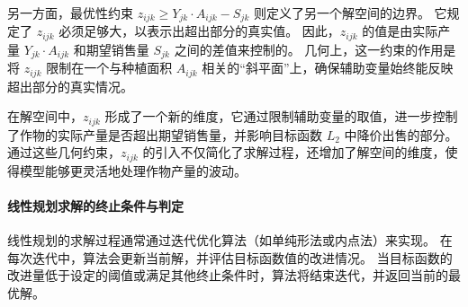 \documentclass[12pt,a4paper]{nmmcm}
\begin{document}
另一方面，最优性约束 $z_{ijk} \geq Y_{jk} \cdot A_{ijk} - S_{jk}$ 则定义了另一个解空间的边界。
它规定了 $z_{ijk}$ 必须足够大，以表示出超出部分的真实值。
因此，$z_{ijk}$ 的值是由实际产量 $Y_{jk} \cdot A_{ijk}$ 和期望销售量 $S_{jk}$ 之间的差值来控制的。
几何上，这一约束的作用是将 $z_{ijk}$ 限制在一个与种植面积 $A_{ijk}$ 相关的“斜平面”上，确保辅助变量始终能反映超出部分的真实情况。


在解空间中，$z_{ijk}$ 形成了一个新的维度，它通过限制辅助变量的取值，进一步控制了作物的实际产量是否超出期望销售量，并影响目标函数 $L_2$ 中降价出售的部分。
通过这些几何约束，$z_{ijk}$ 的引入不仅简化了求解过程，还增加了解空间的维度，使得模型能够更灵活地处理作物产量的波动。


\paragraph{线性规划求解的终止条件与判定}

线性规划的求解过程通常通过迭代优化算法（如单纯形法或内点法）来实现。
在每次迭代中，算法会更新当前解，并评估目标函数值的改进情况。
当目标函数的改进量低于设定的阈值或满足其他终止条件时，算法将结束迭代，并返回当前的最优解。
\end{document}
